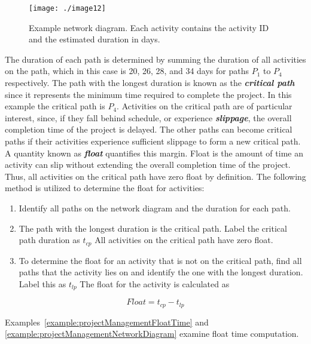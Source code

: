 \begin{figure}[h]
\texttt{[image: ./image12]}
\caption{Example network diagram. Each activity contains the
activity ID and the estimated duration in days.}
\label{figure:exampleNetworkDiagram}
\end{figure}

The duration of each path is determined by summing the duration of all
activities on the path, which in this case is 20, 26, 28, and 34 days
for paths $P_1$ to $P_4$
respectively. The path with the longest duration is known as the
\emph{\textbf{critical path}} since it represents the minimum time
required to complete the project. In this example the critical path is
$P_4$.
Activities on the critical path are of particular interest, since, if
they fall behind schedule, or experience \emph{\textbf{slippage}}, the
overall completion time of the project is delayed. The other paths can
become critical paths if their activities experience sufficient slippage
to form a new critical path. A quantity known as \emph{\textbf{float}}
quantifies this margin. Float is the amount of time an activity can slip
without extending the overall completion time of the project. Thus, all
activities on the critical path have zero float by definition. The
following method is utilized to determine the float for activities:

\begin{enumerate}
\def\labelenumi{\arabic{enumi}.}
\item
  Identify all paths on the network diagram and the duration for each
  path.
\item
  The path with the longest duration is the critical path. Label the
  critical path duration as $t_{cp}$
  All activities on the critical path have zero float.
\item
  To determine the float for an activity that is not on the critical
  path, find all paths that the activity lies on and identify the one
  with the longest duration. Label this as $t_{lp}$ The float for the
  activity is calculated as
\end{enumerate}


\begin{equation}
\label{equ:floatTime}
Float = t_{cp} - t_{lp}
\end{equation}



Examples~\ref{example:projectManagementFloatTime} and 
\ref{example:projectManagementNetworkDiagram} examine float time computation.

